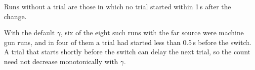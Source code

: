 \begin{table}[tbp]
\centering
\small
\setlength{\tabcolsep}{6pt}
\caption{Sensitivity to the threshold $\gamma$ for starting a trial (200 runs per condition)}
\label{tab:atsip-6}
\par\smallskip
{}
\par\medskip
\begin{minipage}{0.98\textwidth}
\footnotesize
Runs without a trial are those in which no trial started within 1\,s after the change.\par
With the default $\gamma$, six of the eight such runs with the far source were machine gun runs, and in four of them a trial had started less than 0.5\,s before the switch. A trial that starts shortly before the switch can delay the next trial, so the count need not decrease monotonically with $\gamma$.\par
\end{minipage}
\end{table}
